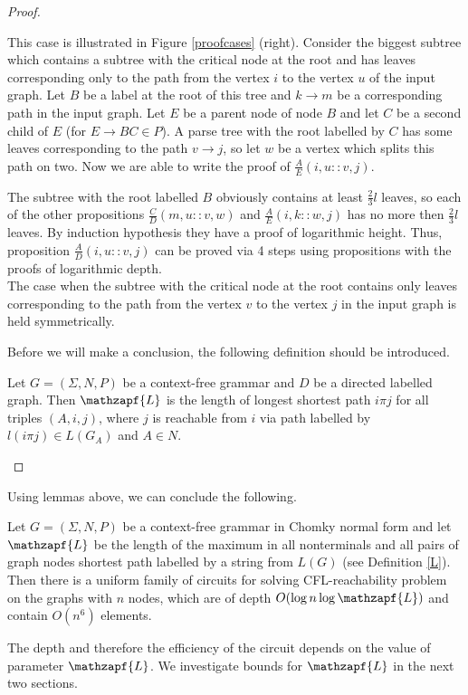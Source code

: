 \begin{proof}
\begin{enumerate}
This case is illustrated in Figure \ref{proofcases} (right). Consider the biggest subtree which contains a subtree with the critical node at the root and has leaves corresponding only to the path from the vertex $i$ to the vertex $u$ of the input graph. Let $B$ be a label at the root of this tree and $k \rightarrow m$  be a corresponding path in the input graph. Let $E$ be a parent node of node $B$ and let $C$ be a second child of $E$ (for $E \rightarrow BC \in P$). A parse tree with the root labelled by $C$ has some leaves corresponding to the path $v \rightarrow j$, so let $w$ be a vertex which splits this path on two. Now we are able to write the proof of $\frac{A}{E}(i , u :: v , j)$.
\begin{prooftree}
\end{prooftree}
The subtree with the root labelled $B$ obviously contains at least $\frac{2}{3}l$ leaves, so each of the other propositions $\frac{C}{D}(m , u :: v , w)$ and $\frac{A}{E}(i , k :: w , j)$ has no more then  $\frac{2}{3}l$ leaves. By induction hypothesis they have a proof of logarithmic height. Thus, proposition  $\frac{A}{D}(i , u :: v , j)$ can be proved via 4 steps using propositions with the proofs of logarithmic depth.
\\The case when the subtree with the critical node at the root contains only leaves corresponding to the path from the vertex $v$ to the vertex $j$ in the input graph is held symmetrically.
\end{enumerate}
Before we will make a conclusion, the following definition should be introduced.
\begin{definition}
\label{L}
Let $G = (\Sigma, N, P)$ be a context-free grammar and $D$ be a directed labelled graph. Then $\mathzapf{L}$ is the length of longest shortest path $i \pi j$ for all triples $(A, i, j)$, where $j$ is reachable from $i$ via path labelled by $l(i\pi j) \in L(G_A)$ and $A \in N$.
\end{definition}
\end{proof}
Using lemmas above, we can conclude the following.
\begin{corollary}
\label{coldepth}
Let $G = (\Sigma, N, P)$ be a context-free grammar in Chomky normal form and let $\mathzapf{L}$ be the length of the maximum in all nonterminals and all pairs of graph nodes shortest path labelled by a string from $L(G)$ (see Definition \ref{L}). Then there is a uniform family of circuits for solving CFL-reachability problem on the graphs with $n$ nodes, which are of depth $O(\log n \log \mathzapf{L})$ and contain $O(n^6)$ elements.
\end{corollary}


The depth and therefore the efficiency of the circuit depends on the value of parameter $\mathzapf{L}$. We investigate bounds for $\mathzapf{L}$ in the next two sections.
